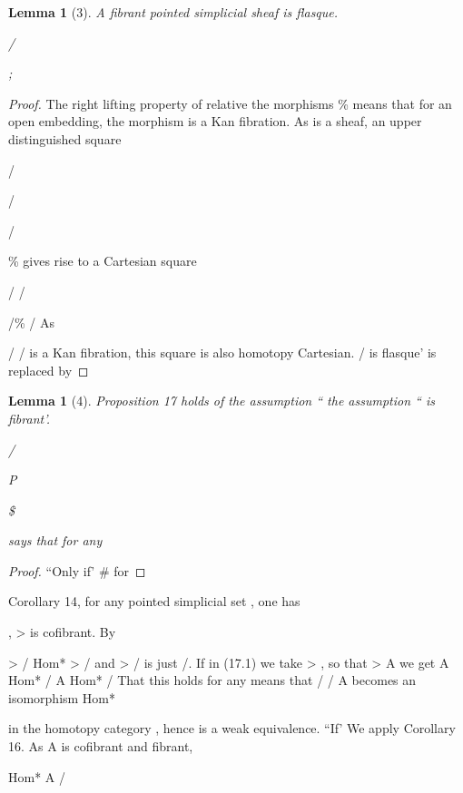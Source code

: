 \documentclass[11pt,a4paper]{article}
\theoremstyle{plain}
\newtheorem{lemma}[theorem]{Lemma}
\theoremstyle{definition}
\begin{document}
\begin{lemma}[3]
A fibrant pointed simplicial sheaf is flasque.

/

; 

\end{lemma}

\begin{proof} The right lifting property of
 relative the morphisms \% means that
for  an open embedding, the morphism
is a Kan fibration.
As is a sheaf, an upper distinguished square


/



/

/



  



\%  
gives rise to a Cartesian square

/  / 







/\%  / 
As

/  /  is a Kan fibration, this square is also homotopy Cartesian. 
/ is flasque' is replaced by

\end{proof}

\begin{lemma}[4]
Proposition 17 holds of the assumption ``
the assumption `` is fibrant'.

/

P 

\$



says that for any
\end{lemma}

\begin{proof} ``Only if' \# for
\end{proof}

Corollary 14, for any pointed simplicial set , one has

 ,  >  is cofibrant. By

 > 
 /  Hom*   >   / 
and  >   /  is just /. If in (17.1) we take 
 >  , so that 
 > A  we get
 A
Hom*   /  A  Hom*   /
That this holds for any means that /
/  A becomes an isomorphism
Hom*

in the homotopy category , hence is a weak equivalence.
``If' We apply Corollary 16. As A
is cofibrant and fibrant,

 
Hom*   A   / 
\end{document}
